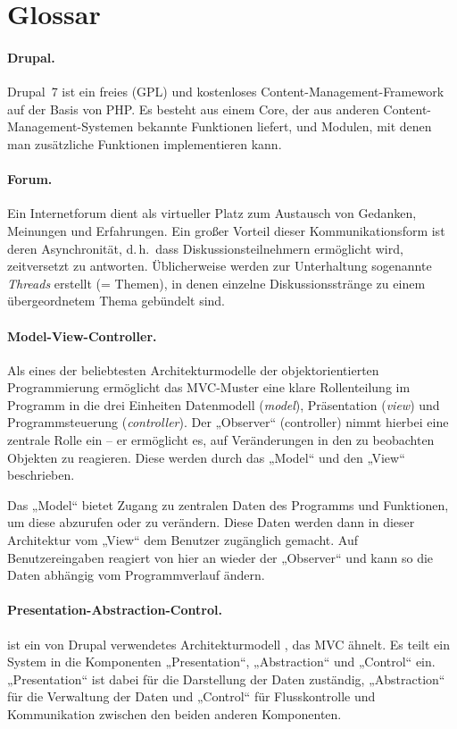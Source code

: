 \documentclass[a4paper,11pt,twoside]{article}
\begin{document}
\section{Glossar}

\paragraph{Drupal.} 
Drupal~7 ist ein freies (GPL) und kostenloses Content-Management-Framework auf
der Basis von PHP. Es besteht aus einem Core, der aus anderen
Content-Management-Systemen bekannte Funktionen liefert, und Modulen, mit
denen man zusätzliche Funktionen implementieren kann.

\paragraph{Forum.} 
Ein Internetforum dient als virtueller Platz zum Austausch von Gedanken,
Meinungen und Erfahrungen. Ein großer Vorteil dieser Kommunikationsform ist
deren Asynchronität, d.\,h.\ dass Diskussionsteilnehmern ermöglicht wird,
zeitversetzt zu antworten. Üblicherweise werden zur Unterhaltung sogenannte
\textit{Threads} erstellt (= Themen), in denen einzelne Diskussionsstränge zu
einem übergeordnetem Thema gebündelt sind.

\paragraph{Model-View-Controller.} 
Als eines der beliebtesten Architekturmodelle der objektorientierten
Programmierung ermöglicht das MVC-Muster \cite{MVC} eine klare Rollenteilung
im Programm in die drei Einheiten Datenmodell (\textit{model}), Präsentation
(\textit{view}) und Programmsteuerung (\textit{controller}). Der „Observer“
(controller) nimmt hierbei eine zentrale Rolle ein -- er ermöglicht es, auf
Veränderungen in den zu beobachten Objekten zu reagieren. Diese werden durch
das „Model“ und den „View“ beschrieben.

Das „Model“ bietet Zugang zu zentralen Daten des Programms und Funktionen, um
diese abzurufen oder zu verändern. Diese Daten werden dann in dieser
Architektur vom „View“ dem Benutzer zugänglich gemacht. Auf Benutzereingaben
reagiert von hier an wieder der „Observer“ und kann so die Daten abhängig vom
Programmverlauf ändern.

\paragraph{Presentation-Abstraction-Control.} 
ist ein von Drupal verwendetes Architekturmodell \cite{PAC}, das MVC ähnelt.
Es teilt ein System in die Komponenten „Presentation“, „Abstraction“ und
„Control“ ein.  „Presentation“ ist dabei für die Darstellung der Daten
zuständig, „Abstraction“ für die Verwaltung der Daten und „Control“ für
Flusskontrolle und Kommunikation zwischen den beiden anderen Komponenten.
\end{document}
